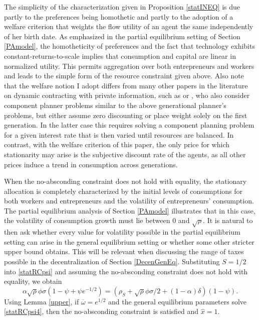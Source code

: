\documentclass[11pt]{article}
\theoremstyle{plain}
\theoremstyle{definition} %
\begin{document}
The simplicity of the characterization given in Proposition \ref{statINEQ} is due partly to the preferences being homothetic and partly to the adoption of a welfare criterion that weights the flow utility of an agent the same independently of her birth date. As emphasized in the partial equilibrium setting of Section \ref{PAmodel}, the homotheticity of preferences and the fact that technology exhibits constant-returns-to-scale implies that consumption and capital are linear in normalized utility. This permits aggregation over both entrepreneurs and workers and leads to the simple form of the resource constraint given above. Also note that the welfare notion I adopt differs from many other papers in the literature on dynamic contracting with private information, such as \cite{atkeson_efficient_1992} or \cite{phelan_incentives_1994}, who also consider component planner problems similar to the above generational planner's problems, but either assume zero discounting or place weight solely on the first generation. In the latter case this requires solving a component planning problem for a given interest rate that is then varied until resources are balanced. In contrast, with the welfare criterion of this paper, the only price for which stationarity may arise is the subjective discount rate of the agents, as all other prices induce a trend in consumption across generations. 

When the no-absconding constraint does not hold with equality, the stationary allocation is completely characterized by the initial levels of consumptions for both workers and entrepreneurs and the volatility of entrepreneurs' consumption. The partial equilibrium analysis of Section \ref{PAmodel} illustrates that in this case, the volatility of consumption growth must lie between 0 and $\sqrt{\rho}$. It is natural to then ask whether every value for volatility possible in the partial equilibrium setting can arise in the general equilibrium setting or whether some other stricter upper bound obtains. This will be relevant when discussing the range of taxes possible in the decentralization of Section \ref{DecenGenEq}. Substituting $S = 1/2$ into \eqref{statRCpsi} and assuming the no-absconding constraint does not hold with equality, we obtain
\begin{equation}
\alpha \sqrt{\rho} \phi \sigma (1 - \psi + \psi e^{-1/2}) = {\left(\rho_S + \sqrt{\rho} \phi \sigma/2 + (1-\alpha)\delta \right)}(1-\psi).
\label{statRCpsi4}
\end{equation}
Using Lemma \ref{upper}, if $\overline{\omega} = e^{1/2}$ and the general equilibrium parameters solve \eqref{statRCpsi4}, then the no-absconding constraint is satisfied and $\hat{x} = 1$. 
\end{document}
